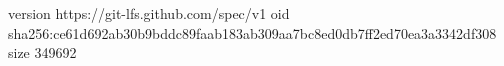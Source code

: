version https://git-lfs.github.com/spec/v1
oid sha256:ce61d692ab30b9bddc89faab183ab309aa7bc8ed0db7ff2ed70ea3a3342df308
size 349692
